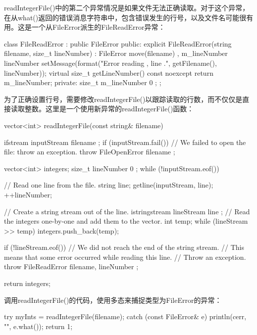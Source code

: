 readIntegerFile()中的第二个异常情况是如果文件无法正确读取。对于这个异常，在从what()返回的错误消息字符串中，包含错误发生的行号，以及文件名可能很有用。这是一个从FileError派生的FileReadError异常：

\begin{cpp}
class FileReadError : public FileError
{
    public:
        explicit FileReadError(string filename, size_t lineNumber)
        : FileError { move(filename) }, m_lineNumber { lineNumber }
        {
            setMessage(format("Error reading {}, line {}.",
            getFilename(), lineNumber));
        }
        virtual size_t getLineNumber() const noexcept { return m_lineNumber; }
    private:
        size_t m_lineNumber { 0 };
};
\end{cpp}

为了正确设置行号，需要修改readIntegerFile()以跟踪读取的行数，而不仅仅是直接读取整数。这里是一个使用新异常的readIntegerFile()函数：

\begin{cpp}
vector<int> readIntegerFile(const string& filename)
{
    ifstream inputStream { filename };
    if (inputStream.fail()) {
        // We failed to open the file: throw an exception.
        throw FileOpenError { filename };
    }

    vector<int> integers;
    size_t lineNumber { 0 };
    while (!inputStream.eof()) {
        // Read one line from the file.
        string line;
        getline(inputStream, line);
        ++lineNumber;

        // Create a string stream out of the line.
        istringstream lineStream { line };
        // Read the integers one-by-one and add them to the vector.
        int temp;
        while (lineStream >> temp) {
            integers.push_back(temp);
        }

        if (!lineStream.eof()) {
            // We did not reach the end of the string stream.
            // This means that some error occurred while reading this line.
            // Throw an exception.
            throw FileReadError { filename, lineNumber };
        }
    }
    return integers;
}
\end{cpp}

调用readIntegerFile()的代码，使用多态来捕捉类型为FileError的异常：

\begin{cpp}
try {
    myInts = readIntegerFile(filename);
} catch (const FileError& e) {
    println(cerr, "{}", e.what());
    return 1;
}
\end{cpp}

